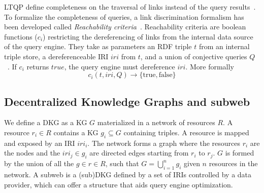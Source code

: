 LTQP define completeness on the traversal of links instead of the query results~\cite{Hartig2012}.
To formalize the completeness of queries, a link discrimination formalism has been developed called \emph{Reachability criteria}~\cite{Hartig2012}.
Reachability criteria are boolean functions ($c_i$) restricting the dereferencing of links from the internal data source of the query engine.
They take as parameters an RDF triple $t$ from an internal triple store, a dereferenceable IRI $iri$ from $t$, and a union of conjective queries $Q$~\cite{Hartig2012}.
If $c_i$ returns $true$, the query engine must dereference $iri$.
More formally
\begin{equation}\label{eq:reachabilityCriteria}
c_i(t, iri, Q) \rightarrow \{\mathrm{true}, \mathrm{false}\}
\end{equation}

\subsection{Decentralized Knowledge Graphs and subweb}\label{sec:dkg}

We define a DKG as a KG $G$ materialized in a network of resources $R$.
A resource $r_i \in R$ contains a KG $g_i \subseteq G$ containing triples.
A resource is mapped and exposed by an IRI $iri_i$.
The network forms a graph where the resources $r_i$ are the nodes and the $iri_j \in g_i$ are directed edges starting from $r_i$ to $r_j$.
$G$ is formed by the union of all the $g \in r \in R$, such that $G = \bigcup_{i=1}^{n}g_i$ given $n$ resources in the network.
A subweb is a (sub)DKG defined by a set of IRIs controlled by a data provider, which can offer a structure that aids query engine optimization.